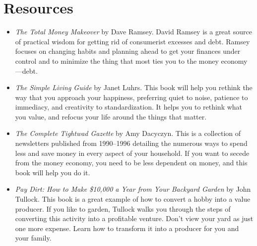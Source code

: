 \section{Resources}
\begin{itemize}
\item 
\textit{The Total Money Makeover} by Dave Ramsey.  David Ramsey is a great source of practical wisdom 
for getting rid of consumerist excesses and debt.  Ramsey focuses on changing habits and planning
ahead to get your finances under control and to minimize the thing that most ties you to the money
economy---debt.
\item
\textit{The Simple Living Guide} by Janet Luhrs.  This book will help you rethink the way that you
approach your happiness, preferring quiet to noise, patience to immediacy, and creativity to 
standardization.  It helps you to rethink what you value, and refocus your life around the things
that matter.
\item
\textit{The Complete Tightwad Gazette} by Amy Dacyczyn.  This is a collection of newsletters 
published from 1990--1996 detailing the numerous ways to spend less and save 
money in every aspect of your household.  If you want to secede from the money economy, you
need to be less dependent on money, and this book will help you do it.
\item 
\textit{Pay Dirt: How to Make \$10,000 a Year from Your Backyard Garden} by John Tullock.
This book is a great example of how to convert a hobby into a value producer.  If you like
to garden, Tullock walks you through the steps of converting this activity into a 
profitable venture.  Don't view your yard as just one more expense.  Learn how to transform
it into a producer for you and your family.
\end{itemize}
